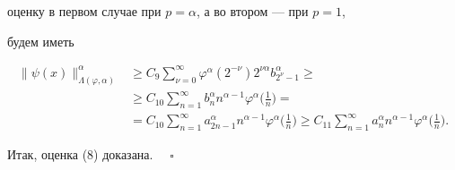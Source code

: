 оценку в первом случае при $p=\alpha$, а во втором --- при $p=1$,


будем иметь


\begin{align*}


\|\psi(x)\|^\alpha_{\Lambda(\varphi,\alpha)}&\ge


C_9\sum^\infty_{\nu=0}\varphi^\alpha(2^{-\nu})2^{\nu\alpha}


b^\alpha_{2^\nu-1}\ge \\


&\ge C_{10}\sum^\infty_{n=1}b^\alpha_n n^{\alpha-1}\varphi^\alpha


\biggl(\frac{1}{n} \biggr)=\\


&=C_{10}\sum^\infty_{n=1}a^\alpha_{2n-1}n^{\alpha-1}\varphi^\alpha


\biggl(\frac{1}{n} \biggr)\ge C_{11}


\sum^\infty_{n=1}a^\alpha_n n^{\alpha-1}\varphi^\alpha


\biggl(\frac{1}{n} \biggr).


\end{align*}





Итак, оценка (8) доказана. $\quad\square$





